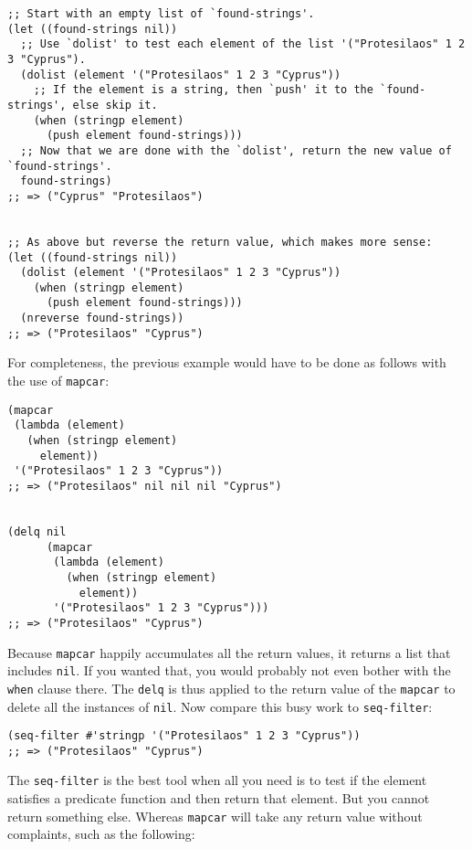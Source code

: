 \documentclass[11pt]{ctexart}
\begin{document}
\begin{verbatim}
;; Start with an empty list of `found-strings'.
(let ((found-strings nil))
  ;; Use `dolist' to test each element of the list '("Protesilaos" 1 2 3 "Cyprus").
  (dolist (element '("Protesilaos" 1 2 3 "Cyprus"))
    ;; If the element is a string, then `push' it to the `found-strings', else skip it.
    (when (stringp element)
      (push element found-strings)))
  ;; Now that we are done with the `dolist', return the new value of `found-strings'.
  found-strings)
;; => ("Cyprus" "Protesilaos")


;; As above but reverse the return value, which makes more sense:
(let ((found-strings nil))
  (dolist (element '("Protesilaos" 1 2 3 "Cyprus"))
    (when (stringp element)
      (push element found-strings)))
  (nreverse found-strings))
;; => ("Protesilaos" "Cyprus")
\end{verbatim}

For completeness, the previous example would have to be done as follows with the use of \texttt{mapcar}:

\begin{verbatim}
(mapcar
 (lambda (element)
   (when (stringp element)
     element))
 '("Protesilaos" 1 2 3 "Cyprus"))
;; => ("Protesilaos" nil nil nil "Cyprus")


(delq nil
      (mapcar
       (lambda (element)
         (when (stringp element)
           element))
       '("Protesilaos" 1 2 3 "Cyprus")))
;; => ("Protesilaos" "Cyprus")
\end{verbatim}

Because \texttt{mapcar} happily accumulates all the return values, it returns a list that includes \texttt{nil}. If you wanted that, you would probably not even bother with the \texttt{when} clause there. The \texttt{delq} is thus applied to the return value of the \texttt{mapcar} to delete all the instances of \texttt{nil}. Now compare this busy work to \texttt{seq-filter}:

\begin{verbatim}
(seq-filter #'stringp '("Protesilaos" 1 2 3 "Cyprus"))
;; => ("Protesilaos" "Cyprus")
\end{verbatim}

The \texttt{seq-filter} is the best tool when all you need is to test if the element satisfies a predicate function and then return that element. But you cannot return something else. Whereas \texttt{mapcar} will take any return value without complaints, such as the following:
\end{document}
